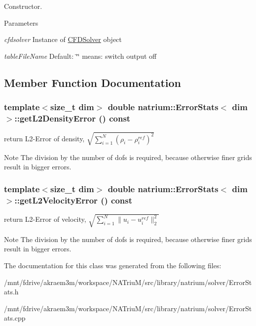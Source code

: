 Constructor. 
\begin{DoxyParams}{Parameters}
\item[{\em cfdsolver}]Instance of \hyperlink{classnatrium_1_1CFDSolver}{CFDSolver} object \item[{\em tableFileName}]Default: \char`\"{}\char`\"{} means: switch output off \end{DoxyParams}


\subsection{Member Function Documentation}
\hypertarget{classnatrium_1_1ErrorStats_a66f817c7daaf15724d5d42de4f17a1e8}{
\subsubsection[{getL2DensityError}]{\setlength{\rightskip}{0pt plus 5cm}template$<$size\_\-t dim$>$ double {\bf natrium::ErrorStats}$<$ dim $>$::getL2DensityError () const}}
\label{classnatrium_1_1ErrorStats_a66f817c7daaf15724d5d42de4f17a1e8}


return L2-\/Error of density, $ \sqrt{ \sum_{i=1}^{N} (\rho_{i} - \rho_{i}^{ref})^{2} } $ \begin{DoxyNote}{Note}
The division by the number of dofs is required, because otherwise finer grids result in bigger errors. 
\end{DoxyNote}
\hypertarget{classnatrium_1_1ErrorStats_a201f625a3607a814fdd645aabfe37fbc}{
\subsubsection[{getL2VelocityError}]{\setlength{\rightskip}{0pt plus 5cm}template$<$size\_\-t dim$>$ double {\bf natrium::ErrorStats}$<$ dim $>$::getL2VelocityError () const}}
\label{classnatrium_1_1ErrorStats_a201f625a3607a814fdd645aabfe37fbc}


return L2-\/Error of velocity, $ \sqrt{ \sum_{i=1}^{N} \|u_{i} - u_{i}^{ref}\|_{2}^{2} } $ \begin{DoxyNote}{Note}
The division by the number of dofs is required, because otherwise finer grids result in bigger errors. 
\end{DoxyNote}


The documentation for this class was generated from the following files:\begin{DoxyCompactItemize}
\item 
/mnt/fdrive/akraem3m/workspace/NATriuM/src/library/natrium/solver/ErrorStats.h\item 
/mnt/fdrive/akraem3m/workspace/NATriuM/src/library/natrium/solver/ErrorStats.cpp\end{DoxyCompactItemize}
